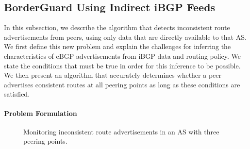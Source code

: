 \subsection{BorderGuard Using Indirect iBGP Feeds}
\label{sec:algo}

In this subsection, we describe the algorithm that detects inconsistent
route advertisements from peers, using only data that are directly
available to that AS.
We first define this new problem and explain the challenges for
inferring the characteristics of eBGP advertisements from iBGP data
and routing policy.  We state the conditions that must be true in
order for this inference to be possible.  We then present an algorithm
that accurately determines whether a peer advertises consistent
routes at all peering points as long as these conditions are
satisfied.


\paragraph{Problem Formulation}

\begin{figure}
\begin{center}
\begin{psfrags}
\end{psfrags}
\end{center}
\caption[Monitoring inconsistent route advertisements]{Monitoring inconsistent route advertisements in an AS with
  three peering points.}
\label{fig:summary}
\end{figure}

